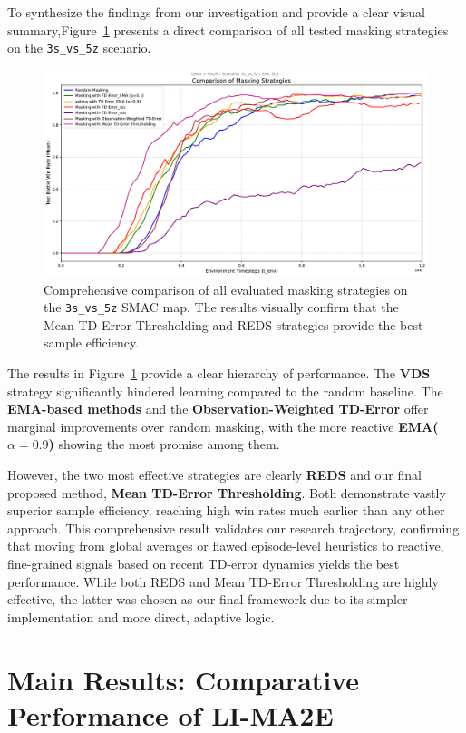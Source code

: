 To synthesize the findings from our investigation and provide a clear visual summary,Figure~\ref{fig:all_strategies_comparison} presents a direct comparison of all tested masking strategies on the  \texttt{3s\_vs\_5z} scenario.
\begin{figure}[H]
    \centering
    \includegraphics[width=1.0\textwidth]{images_pfe/results_li-ma2e/comparison_random_ema_res_vds.pdf} 
    \caption{Comprehensive comparison of all evaluated masking strategies on the \texttt{3s\_vs\_5z}  SMAC map. The results visually confirm that the Mean TD-Error Thresholding and REDS strategies provide the best sample efficiency.}
    \label{fig:all_strategies_comparison}
\end{figure}

The results in Figure~\ref{fig:all_strategies_comparison} provide a clear hierarchy of performance. The \textbf{VDS} strategy significantly hindered learning compared to the random baseline. The \textbf{EMA-based methods} and the \textbf{Observation-Weighted TD-Error} offer marginal improvements over random masking, with the more reactive \textbf{EMA($\alpha=0.9$)} showing the most promise among them.

However, the two most effective strategies are clearly \textbf{REDS} and our final proposed method, \textbf{Mean TD-Error Thresholding}. Both demonstrate vastly superior sample efficiency, reaching high win rates much earlier than any other approach. This comprehensive result validates our research trajectory, confirming that moving from global averages or flawed episode-level heuristics to reactive, fine-grained signals based on recent TD-error dynamics yields the best performance. While both REDS and Mean TD-Error Thresholding are highly effective, the latter was chosen as our final framework due to its simpler implementation and more direct, adaptive logic.
\section{Main Results: Comparative Performance of LI-MA2E}
\label{sec:main_results}

